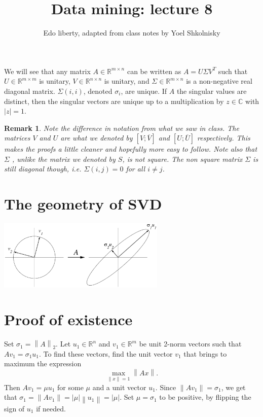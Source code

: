 \documentclass{article}
\title{Data mining: lecture 8} %
\author{Edo liberty, adapted from class notes by Yoel Shkolnisky}
\date{\nonumber}
\newcommand{\R}{\mathbb R}
\newcommand{\norm}[1]{\left \lVert #1 \right \rVert}
\newcommand{\abs}[1]{\lvert #1 \rvert}
\newtheorem{remark}[theorem]{Remark}
\begin{document}
\maketitle

We will see that any
matrix $A \in \R^{m \times n}$ can be written as $A=U\Sigma V^{T}$ such that 
$U \in \mathbb{\R}^{m \times m}$ is unitary, $V \in \R^{n \times n}$ is unitary, and $\Sigma \in \mathbb{R}^{m
\times n}$ is a non-negative real diagonal matrix.
$\Sigma(i,i)$, denoted $\sigma_{i}$, are unique. If $A$ the singular values are distinct, then the singular vectors are
unique up to a multiplication by $z\in\mathbb{C}$ with $\abs{z}=1$.


\begin{remark}
Note the difference in notation from what we saw in class. 
The matrices $V$ and $U$ are what we denoted by $[V ; \overline{V}]$ 
and $[U ; \overline{U}]$ respectively. This makes the proofs a little cleaner
and hopefully more easy to follow. Note also that $\Sigma$ , unlike the matrix we denoted by $S$,
is not square. The non square matrix $\Sigma$ is still diagonal though, i.e. $\Sigma(i,j) = 0$ for all $i \ne j$. 
\end{remark}


\section{The geometry of SVD}
\begin{center}
\includegraphics[width=0.6\textwidth]{images/SVDgeometry.eps}
\end{center}

\section{Proof of existence}
Set $\sigma_{1}=\norm{A}_{2}$. Let $u_{1}\in \mathbb{R}^{n}$ and
$v_{1}\in\mathbb{R}^{m}$ be unit 2-norm vectors such that $Av_{1} =
\sigma_{1}u_{1}$. To find these vectors, find the unit vector
$v_{1}$ that brings to maximum the expression
\begin{equation*}
\max_{\norm{x}=1} \norm{Ax}.
\end{equation*}
Then $A v_{1}=\mu u_{1}$ for some $\mu$ and a unit vector $u_{1}$.
Since $\norm{A v_{1}} = \sigma_{1}$, we get that $\sigma_{1} =
\norm{A v_{1}} = \abs{\mu} \norm{u_{1}} = \abs{\mu}$. Set $\mu =
\sigma_{1}$ to be positive, by flipping the sign of $u_{1}$ if
needed.
\end{document}
